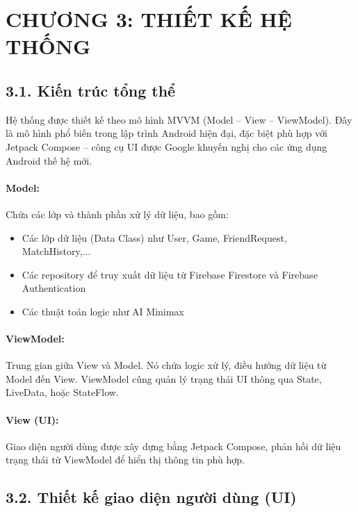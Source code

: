 \documentclass[a4paper,12pt]{article}
\begin{document}
\section*{\centering \textbf{CHƯƠNG 3: THIẾT KẾ HỆ THỐNG}} %

\subsection*{3.1. Kiến trúc tổng thể} %

\justify
\noindent Hệ thống được thiết kế theo mô hình MVVM (Model – View – ViewModel). Đây là mô hình phổ biến trong lập trình Android hiện đại, đặc biệt phù hợp với Jetpack Compose – công cụ UI được Google khuyến nghị cho các ứng dụng Android thế hệ mới.

\paragraph{Model:} %
\noindent Chứa các lớp và thành phần xử lý dữ liệu, bao gồm:
\begin{itemize}[label=·]
    \item Các lớp dữ liệu (Data Class) như User, Game, FriendRequest, MatchHistory,...
    \item Các repository để truy xuất dữ liệu từ Firebase Firestore và Firebase Authentication
    \item Các thuật toán logic như AI Minimax
\end{itemize}

\paragraph{ViewModel:} %
\noindent Trung gian giữa View và Model. Nó chứa logic xử lý, điều hướng dữ liệu từ Model đến View. ViewModel cũng quản lý trạng thái UI thông qua State, LiveData, hoặc StateFlow.

\paragraph{View (UI):} %
\noindent Giao diện người dùng được xây dựng bằng Jetpack Compose, phản hồi dữ liệu trạng thái từ ViewModel để hiển thị thông tin phù hợp.

\subsection*{3.2. Thiết kế giao diện người dùng (UI)} %
\end{document}
